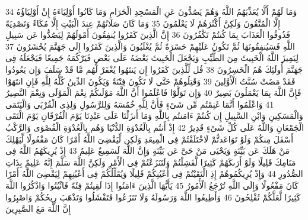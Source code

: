\documentclass[20pt,a4paper]{article}
\begin{document}
{\tiny\colorbox{cl_aya}{34}} وَمَا لَهُمْ أَلَّا يُعَذِّبَهُمُ اللَّهُ وَهُمْ يَصُدُّونَ عَنِ الْمَسْجِدِ الْحَرَامِ وَمَا كَانُوا أَوْلِيَاءَهُ إِنْ أَوْلِيَاؤُهُ إِلَّا الْمُتَّقُونَ وَلَكِنَّ أَكْثَرَهُمْ لَا يَعْلَمُونَ
{\tiny\colorbox{cl_aya}{35}} وَمَا كَانَ صَلَاتُهُمْ عِندَ الْبَيْتِ إِلَّا مُكَاءً وَتَصْدِيَةً فَذُوقُوا الْعَذَابَ بِمَا كُنتُمْ تَكْفُرُونَ
{\tiny\colorbox{cl_aya}{36}} إِنَّ الَّذِينَ كَفَرُوا يُنفِقُونَ أَمْوَلَهُمْ لِيَصُدُّوا عَن سَبِيلِ اللَّهِ فَسَيُنفِقُونَهَا ثُمَّ تَكُونُ عَلَيْهِمْ حَسْرَةً ثُمَّ يُغْلَبُونَ وَالَّذِينَ كَفَرُوا إِلَى جَهَنَّمَ يُحْشَرُونَ
{\tiny\colorbox{cl_aya}{37}} لِيَمِيزَ اللَّهُ الْخَبِيثَ مِنَ الطَّيِّبِ وَيَجْعَلَ الْخَبِيثَ بَعْضَهُ عَلَى بَعْضٍ فَيَرْكُمَهُ جَمِيعًا فَيَجْعَلَهُ فِى جَهَنَّمَ أُولَئِكَ هُمُ الْخَسِرُونَ
{\tiny\colorbox{cl_aya}{38}} قُل لِّلَّذِينَ كَفَرُوا إِن يَنتَهُوا يُغْفَرْ لَهُم مَّا قَدْ سَلَفَ وَإِن يَعُودُوا فَقَدْ مَضَتْ سُنَّتُ الْأَوَّلِينَ
{\tiny\colorbox{cl_aya}{39}} وَقَتِلُوهُمْ حَتَّى لَا تَكُونَ فِتْنَةٌ وَيَكُونَ الدِّينُ كُلُّهُ لِلَّهِ فَإِنِ انتَهَوْا فَإِنَّ اللَّهَ بِمَا يَعْمَلُونَ بَصِيرٌ
{\tiny\colorbox{cl_aya}{40}} وَإِن تَوَلَّوْا فَاعْلَمُوا أَنَّ اللَّهَ مَوْلَىكُمْ نِعْمَ الْمَوْلَى وَنِعْمَ النَّصِيرُ
{\tiny\colorbox{cl_aya}{41}} وَاعْلَمُوا أَنَّمَا غَنِمْتُم مِّن شَىْءٍ فَأَنَّ لِلَّهِ خُمُسَهُ وَلِلرَّسُولِ وَلِذِى الْقُرْبَى وَالْيَتَمَى وَالْمَسَكِينِ وَابْنِ السَّبِيلِ إِن كُنتُمْ ءَامَنتُم بِاللَّهِ وَمَا أَنزَلْنَا عَلَى عَبْدِنَا يَوْمَ الْفُرْقَانِ يَوْمَ الْتَقَى الْجَمْعَانِ وَاللَّهُ عَلَى كُلِّ شَىْءٍ قَدِيرٌ
{\tiny\colorbox{cl_aya}{42}} إِذْ أَنتُم بِالْعُدْوَةِ الدُّنْيَا وَهُم بِالْعُدْوَةِ الْقُصْوَى وَالرَّكْبُ أَسْفَلَ مِنكُمْ وَلَوْ تَوَاعَدتُّمْ لَاخْتَلَفْتُمْ فِى الْمِيعَدِ وَلَكِن لِّيَقْضِىَ اللَّهُ أَمْرًا كَانَ مَفْعُولًا لِّيَهْلِكَ مَنْ هَلَكَ عَن بَيِّنَةٍ وَيَحْيَى مَنْ حَىَّ عَن بَيِّنَةٍ وَإِنَّ اللَّهَ لَسَمِيعٌ عَلِيمٌ
{\tiny\colorbox{cl_aya}{43}} إِذْ يُرِيكَهُمُ اللَّهُ فِى مَنَامِكَ قَلِيلًا وَلَوْ أَرَىكَهُمْ كَثِيرًا لَّفَشِلْتُمْ وَلَتَنَزَعْتُمْ فِى الْأَمْرِ وَلَكِنَّ اللَّهَ سَلَّمَ إِنَّهُ عَلِيمٌ بِذَاتِ الصُّدُورِ
{\tiny\colorbox{cl_aya}{44}} وَإِذْ يُرِيكُمُوهُمْ إِذِ الْتَقَيْتُمْ فِى أَعْيُنِكُمْ قَلِيلًا وَيُقَلِّلُكُمْ فِى أَعْيُنِهِمْ لِيَقْضِىَ اللَّهُ أَمْرًا كَانَ مَفْعُولًا وَإِلَى اللَّهِ تُرْجَعُ الْأُمُورُ
{\tiny\colorbox{cl_aya}{45}} يَأَيُّهَا الَّذِينَ ءَامَنُوا إِذَا لَقِيتُمْ فِئَةً فَاثْبُتُوا وَاذْكُرُوا اللَّهَ كَثِيرًا لَّعَلَّكُمْ تُفْلِحُونَ
{\tiny\colorbox{cl_aya}{46}} وَأَطِيعُوا اللَّهَ وَرَسُولَهُ وَلَا تَنَزَعُوا فَتَفْشَلُوا وَتَذْهَبَ رِيحُكُمْ وَاصْبِرُوا إِنَّ اللَّهَ مَعَ الصَّبِرِينَ
\end{document}
